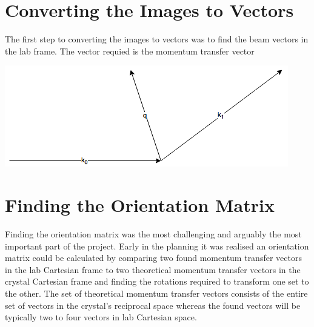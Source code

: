 \documentclass[10pt,a4paper]{article}
\begin{document}
\begin{multicols}{2}
\section*{Converting the Images to Vectors}
The first step to converting the images to vectors was to find the beam vectors in the lab frame. The vector requied is the momentum transfer vector 
\begin{center}
\includegraphics [width=\columnwidth]{vectors.png}
\label{vectors}
\end{center}


\section*{Finding the Orientation Matrix}
Finding the orientation matrix was the most challenging and arguably the most important part of the project. Early in the planning it was realised an orientation matrix could be calculated by comparing two found momentum transfer vectors in the lab Cartesian frame to two theoretical momentum transfer vectors in the crystal Cartesian frame and finding the rotations required to transform one set to the other. The set of theoretical momentum transfer vectors consists of the entire set of vectors in the crystal's reciprocal space %
whereas the found vectors will be typically two to four vectors in lab Cartesian space. 

\end{multicols}
\end{document}
